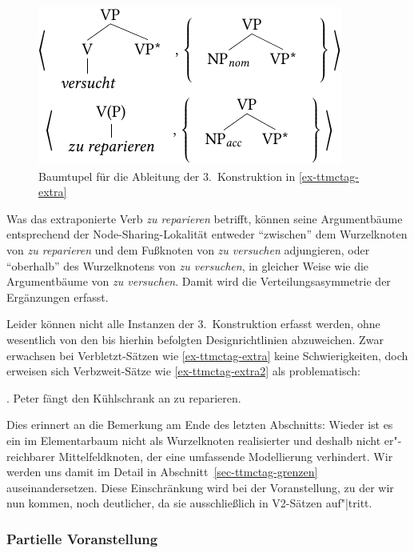 \begin{figure}[t]
\centering
\includegraphics{graphics/abb715.pdf}
\caption{\label{fig-ttmctag-3konstr}Baumtupel für die Ableitung der 3.~Konstruktion in \ref{ex-ttmctag-extra}}
\end{figure}

Was das extraponierte Verb {\it zu reparieren} betrifft, können seine Argumentbäume entsprechend der Node-Sharing-Lokalität entweder "`zwischen"' dem Wurzelknoten von {\it zu reparieren} und dem Fu\ss knoten von {\it zu versuchen} adjungieren, oder "`oberhalb"' des Wurzelknotens von {\it zu versuchen}, in gleicher Weise wie die Argumentbäume von {\it zu versuchen}. Damit wird die Verteilungsasymmetrie der Er\-gän\-zungen erfasst. 

Leider können nicht alle Instanzen der 3.~Konstruktion erfasst werden, ohne wesentlich von den bis hierhin befolgten Designrichtlinien abzuweichen. Zwar erwachsen bei Verbletzt-Sätzen wie \ref{ex-ttmctag-extra} keine Schwierigkeiten, doch erweisen sich Verbzweit-Sätze wie \ref{ex-ttmctag-extra2} als problematisch:\largerpage%

\ex. Peter fängt den Kühlschrank an zu reparieren.\label{ex-ttmctag-extra2}

Dies erinnert an die Bemerkung am Ende des letzten Abschnitts: Wieder ist es ein im Elementarbaum nicht als Wurzelknoten realisierter und deshalb nicht er"-reichbarer Mittelfeldknoten, der eine umfassende Modellierung verhindert. Wir werden uns damit im Detail in Abschnitt~\ref{sec-ttmctag-grenzen} auseinandersetzen. Diese Einschränkung wird bei der Voranstellung, zu der wir nun kommen, noch deutlicher, da sie ausschlie\ss lich in V2-Sätzen auf"|tritt.%
\largerpage%


\subsubsection{Partielle Voranstellung}

